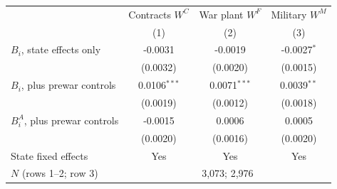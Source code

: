 \begin{tabular}{lccc}
\toprule
& Contracts $W^C$ & War plant $W^F$ & Military $W^M$ \\
& (1) & (2) & (3) \\
\midrule
$B_i$, state effects only & -0.0031 & -0.0019 & -0.0027$^{*}$ \\
 & (0.0032) & (0.0020) & (0.0015) \\
$B_i$, plus prewar controls & 0.0106$^{***}$ & 0.0071$^{***}$ & 0.0039$^{**}$ \\
 & (0.0019) & (0.0012) & (0.0018) \\
$B_i^{A}$, plus prewar controls & -0.0015 & 0.0006 & 0.0005 \\
 & (0.0020) & (0.0016) & (0.0020) \\
\midrule
State fixed effects & Yes & Yes & Yes \\
$N$ (rows 1--2; row 3) & \multicolumn{3}{c}{3,073; 2,976} \\
\bottomrule
\end{tabular}